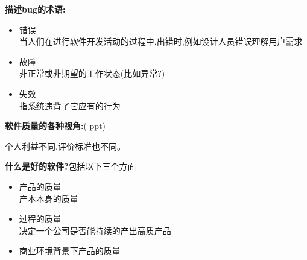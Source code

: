 \documentclass[UTF8,a4paper]{ctexart}
\newcommand{\spaceline}{\vspace{\baselineskip}}
\begin{document}
  \spaceline
  \textbf{描述bug的术语:}
  \begin{itemize}
    \item 错误\\
    当人们在进行软件开发活动的过程中,出错时,例如设计人员错误理解用户需求
    \item 故障\\
    非正常或非期望的工作状态(比如异常?)
    \item 失效\\
    指系统违背了它应有的行为
  \end{itemize}

  \spaceline
  \textbf{软件质量的各种视角:}(\color{red} ppt)

  个人利益不同,评价标准也不同。

  \spaceline
  \textbf{什么是好的软件?}包括以下三个方面
  \begin{itemize}
    \item 产品的质量\\
    产本本身的质量
    \item 过程的质量\\
    决定一个公司是否能持续的产出高质产品
    \item 商业环境背景下产品的质量
  \end{itemize}
\end{document}

